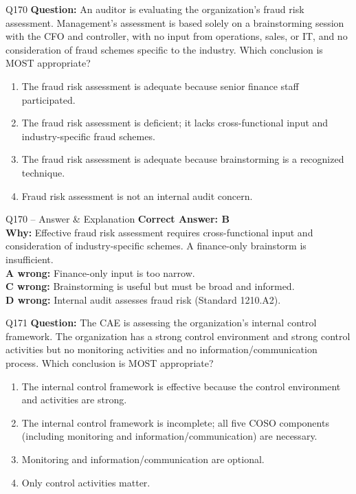 \documentclass[aspectratio=169,10pt]{beamer}
\begin{document}
	\begin{frame}[t]{Q170}
		\small
		\textbf{Question:} An auditor is evaluating the organization's fraud risk assessment. Management's assessment is based solely on a brainstorming session with the CFO and controller, with no input from operations, sales, or IT, and no consideration of fraud schemes specific to the industry. Which conclusion is MOST appropriate?
		\begin{enumerate}[label=\Alph*.,itemsep=1pt,topsep=2pt]
			\item The fraud risk assessment is adequate because senior finance staff participated.
			\item The fraud risk assessment is deficient; it lacks cross-functional input and industry-specific fraud schemes.
			\item The fraud risk assessment is adequate because brainstorming is a recognized technique.
			\item Fraud risk assessment is not an internal audit concern.
		\end{enumerate}
	\end{frame}
	
	\begin{frame}[t]{Q170 -- Answer \& Explanation}
		\small
		\textbf{Correct Answer: B} \\[4pt]
		\textbf{Why:} Effective fraud risk assessment requires cross-functional input and consideration of industry-specific schemes. A finance-only brainstorm is insufficient. \\[4pt]
		\textbf{A wrong:} Finance-only input is too narrow. \\[2pt]
		\textbf{C wrong:} Brainstorming is useful but must be broad and informed. \\[2pt]
		\textbf{D wrong:} Internal audit assesses fraud risk (Standard 1210.A2).
	\end{frame}
	
	\begin{frame}[t]{Q171}
		\small
		\textbf{Question:} The CAE is assessing the organization's internal control framework. The organization has a strong control environment and strong control activities but no monitoring activities and no information/communication process. Which conclusion is MOST appropriate?
		\begin{enumerate}[label=\Alph*.,itemsep=1pt,topsep=2pt]
			\item The internal control framework is effective because the control environment and activities are strong.
			\item The internal control framework is incomplete; all five COSO components (including monitoring and information/communication) are necessary.
			\item Monitoring and information/communication are optional.
			\item Only control activities matter.
		\end{enumerate}
	\end{frame}
	
\end{document}
